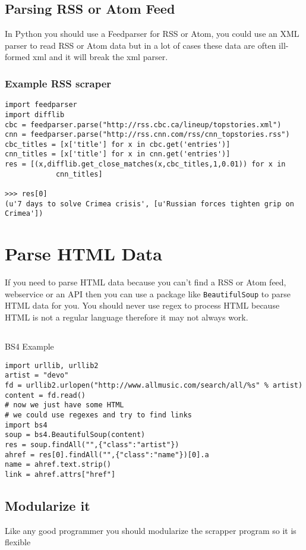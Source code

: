 \documentclass[../CMPUT-404-Notes.tex]{subfiles}
\begin{document}
\subsection{Parsing RSS or Atom Feed}
In Python you should use a Feedparser for RSS or Atom, you could use an XML parser to read RSS or Atom data but in a lot of cases these data are often ill-formed xml and it will break the xml parser.


\subsubsection{Example RSS scraper}
\begin{verbatim}
import feedparser
import difflib
cbc = feedparser.parse("http://rss.cbc.ca/lineup/topstories.xml")
cnn = feedparser.parse("http://rss.cnn.com/rss/cnn_topstories.rss")
cbc_titles = [x['title'] for x in cbc.get('entries')]
cnn_titles = [x['title'] for x in cnn.get('entries')]
res = [(x,difflib.get_close_matches(x,cbc_titles,1,0.01)) for x in
            cnn_titles]

>>> res[0]
(u'7 days to solve Crimea crisis', [u'Russian forces tighten grip on Crimea'])
\end{verbatim}


\section{Parse HTML Data}
If you need to parse HTML data because you can't find a RSS or Atom feed, webservice or an API then you can use a package like \texttt{BeautifulSoup} to parse HTML data for you.
You should never use regex to process HTML because HTML is not a regular language therefore it may not always work. 

\subsection{}{BS4 Example}
\begin{verbatim}
import urllib, urllib2
artist = "devo"
fd = urllib2.urlopen("http://www.allmusic.com/search/all/%s" % artist)
content = fd.read()
# now we just have some HTML
# we could use regexes and try to find links
import bs4
soup = bs4.BeautifulSoup(content)
res = soup.findAll("",{"class":"artist"})
ahref = res[0].findAll("",{"class":"name"})[0].a
name = ahref.text.strip()
link = ahref.attrs["href"]
\end{verbatim}

\subsection{Modularize it}
Like any good programmer you should modularize the scrapper program so it is flexible
\end{document}
